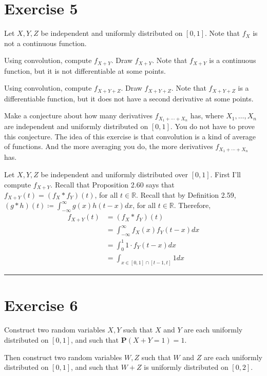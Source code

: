 \documentclass{article}
\theoremstyle{break}
\newenvironment{solution}{{\bf Solution:}}{\hfill\rule{2mm}{2mm}}
\newcommand{\R}{\mathbb{R}}
\renewcommand{\P}{\mathbf{P}}
\begin{document}
\section*{Exercise 5}
Let $X,Y,Z$ be independent and uniformly distributed on $[0,1]$.  Note that $f_{X}$ is not a continuous function.

Using convolution, compute $f_{X+Y}$.  Draw $f_{X+Y}$.  Note that $f_{X+Y}$ is a continuous function, but it is not differentiable at some points.

Using convolution, compute $f_{X+Y+Z}$.  Draw $f_{X+Y+Z}$.  Note that $f_{X+Y+Z}$ is a differentiable function, but it does not have a second derivative at some points.

Make a conjecture about how many derivatives $f_{X_{1}+\cdots+X_{n}}$ has, where $X_{1},\ldots,X_{n}$ are independent and uniformly distributed on $[0,1]$.  You do not have to prove this conjecture.  The idea of this exercise is that convolution is a kind of average of functions.  And the more averaging you do, the more derivatives $f_{X_{1}+\cdots+X_{n}}$ has.

\begin{solution}
Let $X,Y,Z$ be independent and uniformly distributed over $[0,1]$. First I'll compute $f_{X+Y}$. Recall that Proposition 2.60 says that $f_{X+Y}(t) = (f_X \ast f_Y)(t)$, for all $t \in \R$. Recall that by Definition 2.59, $(g \ast h)(t) \coloneqq \int_{-\infty}^\infty g(x) h(t-x) dx$, for all $t \in \R$. Therefore,
\begin{align*}
f_{X+Y}(t) &= (f_X \ast f_Y)(t) \\
	&= \int_{-\infty}^\infty f_X(x) f_Y(t-x) dx \\
	&= \int_0^1 1 \cdot f_Y(t-x) dx \\
	&= \int_{x \in [0,1]\cap[t-1,t]} 1 dx
\end{align*}





\end{solution}


\section*{Exercise 6}
Construct two random variables $X,Y$ such that $X$ and $Y$ are each uniformly distributed on $[0,1]$, and such that $\P(X+Y=1)=1$.

Then construct two random variables $W,Z$ such that $W$ and $Z$ are each uniformly distributed on $[0,1]$, and such that $W+Z$ is uniformly distributed on $[0,2]$.
\end{document}

